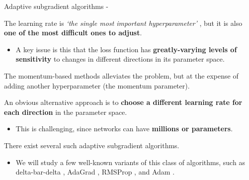 

\begin{frame}[t,allowframebreaks]{
    Adaptive subgradient algorithms -}

    The \gls{learning rate}
    is {\em `the single most important 
    \gls{hyperparameter}'} \cite{Bengio:2012gbt},
    but it is also {\bf one of the most difficult ones to adjust}.\\
    \begin{itemize}
        \small
        \item
        A key issue is this that
        the \gls{loss function} has 
        {\bf greatly-varying levels of sensitivity} to changes 
        in different directions in its parameter space.\\
    \end{itemize}

    \vspace{0.2cm}

    The \gls{momentum}-based methods
    alleviates the problem, 
    but at the expense of adding another \gls{hyperparameter}
    (the \gls{momentum parameter}).

    \vspace{0.2cm}

    An obvious alternative approach is to {\bf choose a different 
    \gls{learning rate} for each direction} in the parameter space.\\
    \begin{itemize}
        \small
        \item This is challenging, since networks 
        can have {\bf millions or parameters}.
    \end{itemize}

    \vspace{0.2cm}

    There exist several such 
    \gls{adaptive subgradient} algorithms.\\
    \begin{itemize}
        \small
        \item 
        We will study a few well-known variants of this 
        class of algorithms, such as 
        \gls{delta-bar-delta} \cite{Jacobs:1988dbd},
        \gls{AdaGrad} \cite{Duchi:11a},
        \gls{RMSProp} \cite{Hinton:2012rmsp}, and
        \gls{Adam} \cite{Kingma:2017adam}.
    \end{itemize}


\end{frame}
